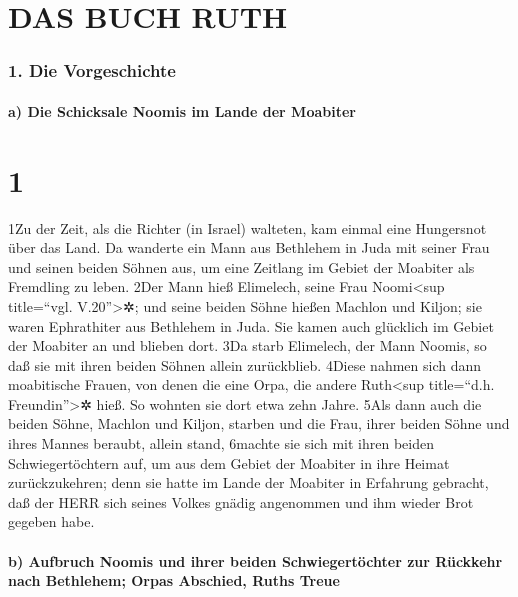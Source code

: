 \hypertarget{das-buch-ruth}{%
\section{DAS BUCH RUTH}\label{das-buch-ruth}}

\hypertarget{die-vorgeschichte}{%
\subsubsection{1. Die Vorgeschichte}\label{die-vorgeschichte}}

\hypertarget{a-die-schicksale-noomis-im-lande-der-moabiter}{%
\paragraph{a) Die Schicksale Noomis im Lande der
Moabiter}\label{a-die-schicksale-noomis-im-lande-der-moabiter}}

\hypertarget{section}{%
\section{1}\label{section}}

1Zu der Zeit, als die Richter (in Israel) walteten, kam einmal eine
Hungersnot über das Land. Da wanderte ein Mann aus Bethlehem in Juda mit
seiner Frau und seinen beiden Söhnen aus, um eine Zeitlang im Gebiet der
Moabiter als Fremdling zu leben. 2Der Mann hieß Elimelech, seine Frau
Noomi\textless sup title=``vgl. V.20''\textgreater✲; und seine beiden
Söhne hießen Machlon und Kiljon; sie waren Ephrathiter aus Bethlehem in
Juda. Sie kamen auch glücklich im Gebiet der Moabiter an und blieben
dort. 3Da starb Elimelech, der Mann Noomis, so daß sie mit ihren beiden
Söhnen allein zurückblieb. 4Diese nahmen sich dann moabitische Frauen,
von denen die eine Orpa, die andere Ruth\textless sup title=``d.h.
Freundin''\textgreater✲ hieß. So wohnten sie dort etwa zehn Jahre. 5Als
dann auch die beiden Söhne, Machlon und Kiljon, starben und die Frau,
ihrer beiden Söhne und ihres Mannes beraubt, allein stand, 6machte sie
sich mit ihren beiden Schwiegertöchtern auf, um aus dem Gebiet der
Moabiter in ihre Heimat zurückzukehren; denn sie hatte im Lande der
Moabiter in Erfahrung gebracht, daß der HERR sich seines Volkes gnädig
angenommen und ihm wieder Brot gegeben habe.

\hypertarget{b-aufbruch-noomis-und-ihrer-beiden-schwiegertuxf6chter-zur-ruxfcckkehr-nach-bethlehem-orpas-abschied-ruths-treue}{%
\paragraph{b) Aufbruch Noomis und ihrer beiden Schwiegertöchter zur
Rückkehr nach Bethlehem; Orpas Abschied, Ruths
Treue}\label{b-aufbruch-noomis-und-ihrer-beiden-schwiegertuxf6chter-zur-ruxfcckkehr-nach-bethlehem-orpas-abschied-ruths-treue}}

